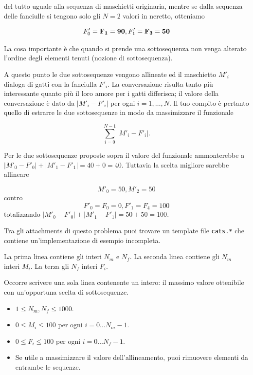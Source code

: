 del tutto uguale alla sequenza di maschietti originaria, mentre se dalla sequenza delle fanciulle si tengono solo gli $N=2$ valori in neretto, otteniamo

\[
   F'_0 = {\bf F_1 = 90}, F'_1 = {\bf F_3 = 50}
\]

La cosa importante è che quando si prende una sottosequenza non venga alterato l'ordine degli elementi tenuti (nozione di sottosequenza).

A questo punto le due sottosequenze vengono allineate ed il maschietto $M'_i$ dialoga di gatti con la fanciulla $F'_i$. La conversazione risulta tanto più interessante quanto più il loro amore per i gatti differisca; il valore della conversazione è dato da $|M'_i - F'_i|$ per ogni $i=1,\ldots, N$.
Il tuo compito è pertanto quello di estrarre le due sottosequenze in modo da massimizzare il funzionale

\[
   \sum_{i=0}^{N-1} |M'_i - F'_i| .
\]

Per le due sottosequenze proposte sopra il valore del funzionale ammonterebbe a $|M'_0 - F'_0| + |M'_1 - F'_1| = 40 +0 = 40$. Tuttavia la scelta migliore sarebbe allineare

\[
   M'_0 = 50, M'_2=50
\]
contro
\[
   F'_0 = F_0 = 0, F'_1=F_4=100
\]
totalizzando $|M'_0 - F'_0| + |M'_1 - F'_1| = 50+50 = 100$. 


\begin{warning}
Tra gli attachments di questo problema puoi trovare un template file \texttt{cats.*} che contiene un'implementazione di esempio incompleta.
\end{warning}

\InputFile
La prima linea contiene gli interi $N_m$ e $N_f$. La seconda linea contiene gli $N_m$ interi $M_i$. La terza gli $N_f$ interi $F_i$.

\OutputFile
Occorre scrivere una sola linea contenente un intero: il massimo valore ottenibile con un'opportuna scelta di sottosequenze. 

\Constraints
\begin{itemize}[nolistsep, itemsep=2mm]
	\item $1 \le N_m, N_f \le 1000$.
	\item $0 \le M_i \le 100$ per ogni $i=0\ldots N_m-1$.
	\item $0 \le F_i \le 100$ per ogni $i=0\ldots N_f-1$.
        \item Se utile a massimizzare il valore dell'allineamento, puoi rimuovere elementi da entrambe le sequenze.
\end{itemize}


